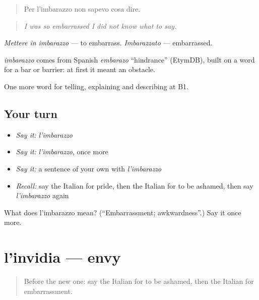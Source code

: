 \begin{quote}
Per l'imbarazzo non sapevo cosa dire.
\end{quote}

\begin{quote}
\emph{I was so embarrassed I did not know what to say.}
\end{quote}

\emph{Mettere in imbarazzo} — to embarrass. \emph{Imbarazzato} — embarrassed.

\begin{cousinweb}
\emph{imbarazzo} comes from Spanish \emph{embarazo} \textquotedblleft{}hindrance\textquotedblright{} (EtymDB), built on a word for a bar or barrier: at first it meant an obstacle.
\end{cousinweb}

\begin{grammarlens}[title={What you've built}]
One more word for telling, explaining and describing at B1.
\end{grammarlens}

\subsection*{Your turn}
\begin{itemize}
\raggedright
  \item \emph{Say it:} \emph{l'imbarazzo}
  \item \emph{Say it:} \emph{l'imbarazzo}, once more
  \item \emph{Say it:} a sentence of your own with \emph{l'imbarazzo}
  \item \emph{Recall:} say the Italian for pride, then the Italian for to be ashamed, then say \emph{l'imbarazzo} again
\end{itemize}

\begin{tcolorbox}[breakable,colback=teal!4,colframe=teal!35!black,title={Before you move on}]
What does l'imbarazzo mean? (\textquotedblleft{}Embarrassment; awkwardness\textquotedblright{}.) Say it once more.
\end{tcolorbox}
\section[l'invidia]{l'invidia — envy}

\label{lesson:IT-C478-invidia}



\begin{quote}
Before the new one: say the Italian for to be ashamed, then the Italian for embarrassment.
\end{quote}

